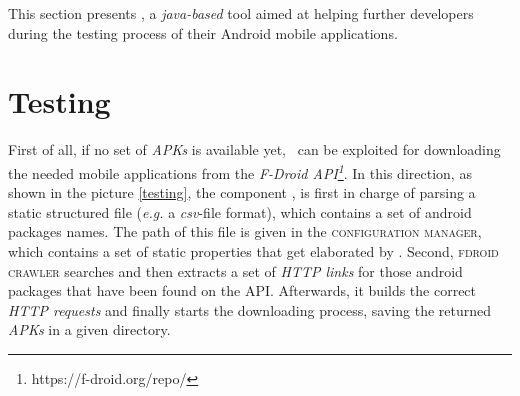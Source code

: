 \label{chapter:tool}
This section presents \toolname, a \textit{java-based} tool aimed at helping further developers during the testing process of their Android mobile applications. \\



\section{Testing}
\label{tool: testing}
First of all, if no set of \textit{APKs} is available yet, \toolname\ can be exploited for downloading the needed mobile applications from the \textit{F-Droid API\footnote{https://f-droid.org/repo/}}. In this direction, as shown in the picture \ref{testing}, the component \FDroidCrawler, is first in charge of  parsing a static structured file (\textit{e.g.} a \textit{csv}-file format), which contains a set of android packages names. 
The path of this file is given in the \textsc{configuration manager}, which contains a set of static properties that get elaborated by \toolname. Second, \textsc{fdroid crawler} searches and then extracts a set of \textit{HTTP links} for those android packages that have been found on the API. Afterwards, it builds the correct \textit{HTTP requests} and finally starts the downloading process, saving the returned \textit{APKs} in a given directory.

